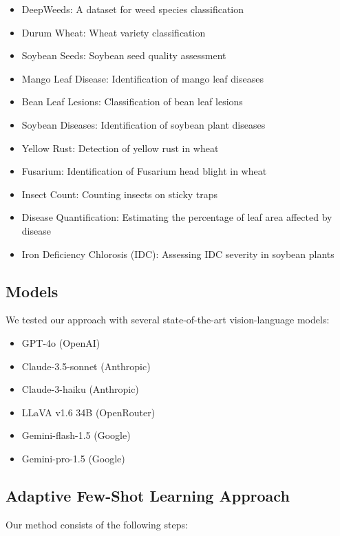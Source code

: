 \documentclass[12pt,a4paper]{article}
\begin{document}
\begin{itemize}
    \item DeepWeeds: A dataset for weed species classification
    \item Durum Wheat: Wheat variety classification
    \item Soybean Seeds: Soybean seed quality assessment
    \item Mango Leaf Disease: Identification of mango leaf diseases
    \item Bean Leaf Lesions: Classification of bean leaf lesions
    \item Soybean Diseases: Identification of soybean plant diseases
    \item Yellow Rust: Detection of yellow rust in wheat
    \item Fusarium: Identification of Fusarium head blight in wheat
    \item Insect Count: Counting insects on sticky traps
    \item Disease Quantification: Estimating the percentage of leaf area affected by disease
    \item Iron Deficiency Chlorosis (IDC): Assessing IDC severity in soybean plants
\end{itemize}

\subsection{Models}

We tested our approach with several state-of-the-art vision-language models:

\begin{itemize}
    \item GPT-4o (OpenAI)
    \item Claude-3.5-sonnet (Anthropic)
    \item Claude-3-haiku (Anthropic)
    \item LLaVA v1.6 34B (OpenRouter)
    \item Gemini-flash-1.5 (Google)
    \item Gemini-pro-1.5 (Google)
\end{itemize}

\subsection{Adaptive Few-Shot Learning Approach}

Our method consists of the following steps:
\end{document}
